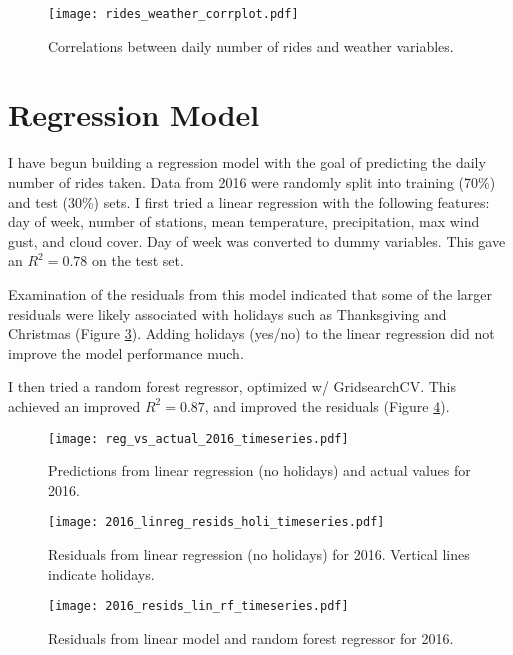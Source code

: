 \documentclass[11pt]{article}
\begin{document}
\begin{figure}[h]
\texttt{[image: rides\_weather\_corrplot.pdf]}
\caption{Correlations between daily number of rides and weather variables.}
\label{rides_wea_corr}
\end{figure}


\clearpage
\section{Regression Model}

I have begun building a regression model with the goal of predicting the daily number of rides taken. Data from 2016 were randomly split into training (70\%) and test (30\%) sets. I first tried a linear regression with the following features: day of week, number of stations, mean temperature, precipitation, max wind gust, and cloud cover. Day of week was converted to dummy variables. This gave an $R^2=0.78$ on the test set.

Examination of the residuals from this model indicated that some of the larger residuals were likely associated with holidays such as Thanksgiving and Christmas (Figure \ref{resids_holi_2016}). Adding holidays (yes/no) to the linear regression did not improve the model performance much.

I then tried a random forest regressor, optimized w/ GridsearchCV. This achieved an improved $R^2=0.87$, and improved the residuals (Figure \ref{linreg_rf_resids_2016}).

\begin{figure}[h]
\texttt{[image: reg\_vs\_actual\_2016\_timeseries.pdf]}
\caption{Predictions from linear regression (no holidays) and actual values for 2016.}
\label{}
\end{figure}




\begin{figure}[h]
\texttt{[image: 2016\_linreg\_resids\_holi\_timeseries.pdf]}
\caption{Residuals from linear regression (no holidays) for 2016. Vertical lines indicate holidays.}
\label{resids_holi_2016}
\end{figure}




\begin{figure}[h]
\texttt{[image: 2016\_resids\_lin\_rf\_timeseries.pdf]}
\caption{Residuals from linear model and random forest regressor for 2016.}
\label{linreg_rf_resids_2016}
\end{figure}
\end{document}
